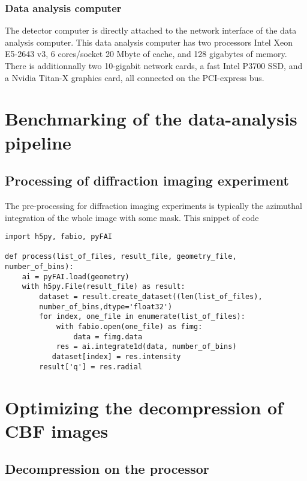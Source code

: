 \documentclass[preprint, pdf]{iucr}              %
\begin{document}
\subsubsection{Data analysis computer}

The detector computer is directly attached to the network interface of the data
analysis computer. 
This data analysis computer has two processors Intel Xeon E5-2643 v3, 6
cores/socket 20 Mbyte of cache, and 128 gigabytes of memory. 
There is additionnally two 10-gigabit network cards, a fast Intel P3700 SSD,
and a Nvidia Titan-X graphics card, all connected on the PCI-express bus.

\section{Benchmarking of the data-analysis pipeline}

\subsection{Processing of diffraction imaging experiment}

The pre-processing for diffraction imaging experiments is typically the
azimuthal integration of the whole image with some mask. 
This snippet of code  

\label{sequential}
\begin{verbatim}
import h5py, fabio, pyFAI

def process(list_of_files, result_file, geometry_file, number_of_bins):
    ai = pyFAI.load(geometry)
    with h5py.File(result_file) as result:
        dataset = result.create_dataset((len(list_of_files),
        number_of_bins,dtype='float32') 
        for index, one_file in enumerate(list_of_files):
            with fabio.open(one_file) as fimg:
                data = fimg.data
            res = ai.integrate1d(data, number_of_bins)
           dataset[index] = res.intensity
        result['q'] = res.radial
\end{verbatim}


\section{Optimizing the decompression of CBF images}

\subsection{Decompression on the processor}
\end{document}
